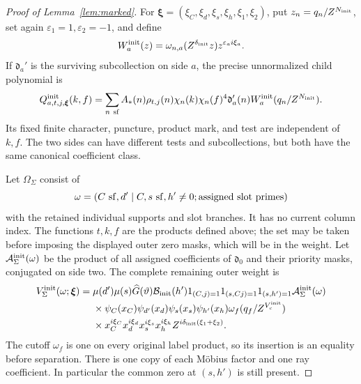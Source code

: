 \documentclass[12pt]{article}
\begin{document}
\begin{proof}[Proof of Lemma~\ref{lem:marked}]
For \(\boldsymbol\xi=(\xi_C,\xi_d,\xi_s,\xi_h,\xi_1,\xi_2)\), put
\(z_n=q_n/Z^{N_{\rm init}}\), set again
\(\varepsilon_1=1,\varepsilon_2=-1\), and define
\[
 W_a^{\rm init}(z)=\omega_{n,a}(Z^{\delta_{\rm init}}z)
                       z^{\varepsilon_a i\xi_a}.
\]
If \(\mathfrak d_a'\) is the surviving subcollection on side \(a\),
the precise unnormalized child polynomial is
\begin{equation}\label{eq:initial-child-polynomial}
 Q^{\rm init}_{a,t,j,\boldsymbol\xi}(k,f)
 =\sum_{n\ {\rm sf}}A_*(n)\rho_{t,j}(n)
 \chi_n(k)\chi_n(f)^4\mathfrak d_a'(n)
 W_a^{\rm init}(q_n/Z^{N_{\rm init}}).
\end{equation}
Its fixed finite character, puncture, product mark, and test are
independent of \(k,f\).  The two sides can have different tests and
subcollections, but both have the same canonical coefficient class.

Let \(\Omega_\Sigma\) consist of
\[
 \omega=(C\ {\rm sf},d'\mid C,s\ {\rm sf},h'\ne0;
                      \text{assigned slot primes})
\]
with the retained individual supports and slot branches.  It has no
current column index.  The functions \(t,k,f\) are the products
defined above; the set may be taken before imposing the displayed
outer zero masks, which will be in the weight.  Let
\(\mathcal A_\Sigma^{\rm init}(\omega)\) be the product of all
assigned coefficients of \(\mathfrak d_0\) and their priority masks,
conjugated on side two.  The complete remaining outer weight is
\begin{equation}\label{eq:initial-outer-weight}
 \begin{split}
 V_\Sigma^{\rm init}(\omega;\boldsymbol\xi)={}&
 \mu(d')\mu(s)\widehat G(\vartheta)\mathcal B_{\rm init}(h')
 1_{(C,j)=1}1_{(s,Cj)=1}1_{(s,h')=1}
 \mathcal A_\Sigma^{\rm init}(\omega)\\
 &\times\psi_C(x_C)\psi_{d'}(x_d)\psi_s(x_s)\psi_{h'}(x_h)
 \omega_f(q_f/Z^{V_c^{\rm init}})\\
 &\times x_C^{i\xi_C}x_d^{i\xi_d}x_s^{i\xi_s}x_h^{i\xi_h}
 Z^{i\delta_{\rm init}(\xi_1+\xi_2)}.
 \end{split}
\end{equation}
The cutoff \(\omega_f\) is one on every original label product, so
its insertion is an equality before separation.  There is one copy
of each M\"obius factor and one ray coefficient.  In particular the
common zero at \((s,h')\) is still present.


\end{proof}
\end{document}
